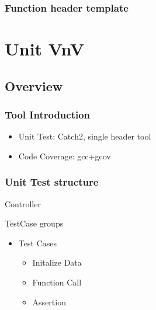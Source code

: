 \documentclass[12pt]{beamer}
\begin{document}
	\begin{frame}
		\frametitle{Function header template}
		
	\end{frame}
	\section{Unit VnV}
	\subsection{Overview}
	\begin{frame}
		\frametitle{Tool Introduction}
		\begin{itemize}
			\item Unit Test: Catch2, single header tool
			\item Code Coverage: gcc+gcov
		\end{itemize}
	\end{frame}
	\begin{frame}
		\frametitle{Unit Test structure}
		Controller
		
		TestCase groups
		\begin{itemize}
			\item Test Cases
			\begin{itemize}
				\item Initalize Data
				\item Function Call
				\item Assertion
			\end{itemize}
		\end{itemize}
	\end{frame}
\end{document}
